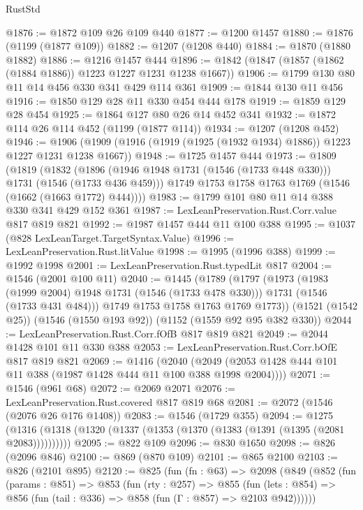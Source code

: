 \begin{lexlean}{RustStd}
\begin{coremodule}
@1876 := @1872 @109 @26 @109 @440
@1877 := @1200 @1457
@1880 := @1876 (@1199 (@1877 @109))
@1882 := @1207 (@1208 @440)
@1884 := @1870 (@1880 @1882)
@1886 := @1216 @1457 @444
@1896 := @1842 (@1847 (@1857 (@1862 (@1884 @1886)) @1223 @1227 @1231 @1238 @1667))
@1906 := @1799 @130 @80 @11 @14 @456 @330 @341 @429 @114 @361
@1909 := @1844 @130 @11 @456
@1916 := @1850 @129 @28 @11 @330 @454 @444 @178
@1919 := @1859 @129 @28 @454
@1925 := @1864 @127 @80 @26 @14 @452 @341
@1932 := @1872 @114 @26 @114 @452 (@1199 (@1877 @114))
@1934 := @1207 (@1208 @452)
@1946 := @1906 (@1909 (@1916 (@1919 (@1925 (@1932 @1934) @1886)) @1223 @1227 @1231 @1238 @1667))
@1948 := @1725 @1457 @444
@1973 := @1809
    (@1819
      (@1832
        (@1896 (@1946 @1948 @1731 (@1546 (@1733 @448 @330))) @1731 (@1546 (@1733 @436 @459)))
        @1749
        @1753
        @1758
        @1763
        @1769
        (@1546 (@1662 (@1663 @1772) @444))))
@1983 := @1799 @101 @80 @11 @14 @388 @330 @341 @429 @152 @361
@1987 := LexLeanPreservation.Rust.Corr.value @817 @819 @821
@1992 := @1987 @1457 @444 @11 @100 @388
@1995 := @1037 (@828 LexLeanTarget.TargetSyntax.Value)
@1996 := LexLeanPreservation.Rust.litValue
@1998 := @1995 (@1996 @388)
@1999 := @1992 @1998
@2001 := LexLeanPreservation.Rust.typedLit @817
@2004 := @1546 (@2001 @100 @11)
@2040 := @1445
    (@1789
      (@1797
        (@1973
          (@1983 (@1999 @2004) @1948 @1731 (@1546 (@1733 @478 @330)))
          @1731
          (@1546 (@1733 @431 @484)))
        @1749
        @1753
        @1758
        @1763
        @1769
        @1773))
    (@1521 (@1542 @25))
    (@1546 (@1550 @193 @92))
    (@1152 (@1559 @92 @95 @382 @330))
@2044 := LexLeanPreservation.Rust.Corr.fOfB @817 @819 @821
@2049 := @2044 @1428 @101 @11 @330 @388
@2053 := LexLeanPreservation.Rust.Corr.bOfE @817 @819 @821
@2069 := @1416
    (@2040 (@2049 (@2053 @1428 @444 @101 @11 @388 (@1987 @1428 @444 @11 @100 @388 @1998 @2004))))
@2071 := @1546 (@961 @68)
@2072 := @2069 @2071
@2076 := LexLeanPreservation.Rust.covered @817 @819 @68
@2081 := @2072 (@1546 (@2076 @26 @176 @1408))
@2083 := @1546 (@1729 @355)
@2094 := @1275 (@1316 (@1318 (@1320 (@1337 (@1353 (@1370 (@1383 (@1391 (@1395 (@2081 @2083))))))))))
@2095 := @822 @109
@2096 := @830 @1650
@2098 := @826 (@2096 @846)
@2100 := @869 (@870 @109)
@2101 := @865 @2100
@2103 := @826 (@2101 @895)
@2120 := @825
    (fun (fn : @63) =>
    @2098
      (@849
        (@852
          (fun (params : @851) =>
          @853
            (fun (rty : @257) =>
            @855
              (fun (lets : @854) =>
              @856 (fun (tail : @336) => @858 (fun (Γ : @857) => @2103 @942))))))

\end{coremodule}
\end{lexlean}
